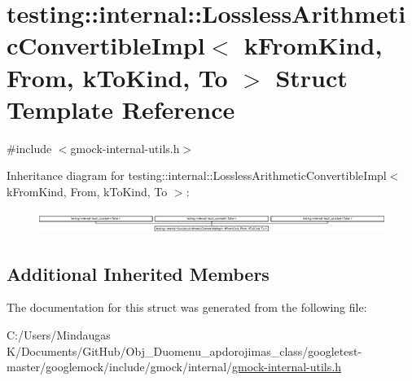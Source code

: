 \hypertarget{structtesting_1_1internal_1_1_lossless_arithmetic_convertible_impl}{}\section{testing\+::internal\+::Lossless\+Arithmetic\+Convertible\+Impl$<$ k\+From\+Kind, From, k\+To\+Kind, To $>$ Struct Template Reference}
\label{structtesting_1_1internal_1_1_lossless_arithmetic_convertible_impl}


{\ttfamily \#include $<$gmock-\/internal-\/utils.\+h$>$}

Inheritance diagram for testing\+::internal\+::Lossless\+Arithmetic\+Convertible\+Impl$<$ k\+From\+Kind, From, k\+To\+Kind, To $>$\+:\begin{figure}[H]
\begin{center}
\leavevmode
\includegraphics[height=0.746667cm]{de/d5d/structtesting_1_1internal_1_1_lossless_arithmetic_convertible_impl}
\end{center}
\end{figure}
\subsection*{Additional Inherited Members}


The documentation for this struct was generated from the following file\+:\begin{DoxyCompactItemize}
\item 
C\+:/\+Users/\+Mindaugas K/\+Documents/\+Git\+Hub/\+Obj\+\_\+\+Duomenu\+\_\+apdorojimas\+\_\+class/googletest-\/master/googlemock/include/gmock/internal/\mbox{\hyperlink{googletest-master_2googlemock_2include_2gmock_2internal_2gmock-internal-utils_8h}{gmock-\/internal-\/utils.\+h}}\end{DoxyCompactItemize}
